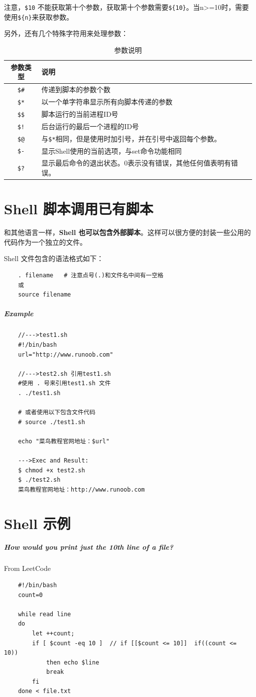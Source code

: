 \documentclass[UTF8,a4paper,12pt]{ctexbook}
\begin{document}
			注意，\verb|$10| 不能获取第十个参数，获取第十个参数需要\verb|${10}|。当n>=10时，需要使用\verb|${n}|来获取参数。 
			
			另外，还有几个特殊字符用来处理参数：
			\begin{table}[H]
				\centering
				\begin{tabular}{c|m{13cm}}
					\hline
				     参数类型   &  说明\\
					\hline 
					\verb|$#| & 传递到脚本的参数个数\\
					\verb|$*| & 以一个单字符串显示所有向脚本传递的参数\\
					\verb|$$| & 脚本运行的当前进程ID号\\
					\verb|$!| & 后台运行的最后一个进程的ID号\\
					\verb|$@| & 与\verb|$*|相同，但是使用时加引号，并在引号中返回每个参数。\\
					\verb|$-| & 显示Shell使用的当前选项，与set命令功能相同\\
					\verb|$?| & 显示最后命令的退出状态。0表示没有错误，其他任何值表明有错误。\\					
					\hline
				\end{tabular}
				\caption{参数说明}
			\end{table}
	 \section{Shell 脚本调用已有脚本}
		 和其他语言一样，\textbf{Shell 也可以包含外部脚本}。这样可以很方便的封装一些公用的代码作为一个独立的文件。
		 
		 Shell 文件包含的语法格式如下：
		 	\begin{lstlisting}
	. filename   # 注意点号(.)和文件名中间有一空格
	或	
	source filename
			\end{lstlisting}
			\subparagraph{Example}
			\begin{lstlisting}
	//--->test1.sh
	#!/bin/bash
	url="http://www.runoob.com"
	
	//--->test2.sh 引用test1.sh
	#使用 . 号来引用test1.sh 文件
	. ./test1.sh
	
	# 或者使用以下包含文件代码
	# source ./test1.sh
	
	echo "菜鸟教程官网地址：$url"
	
	--->Exec and Result:
	$ chmod +x test2.sh 
	$ ./test2.sh 
	菜鸟教程官网地址：http://www.runoob.com
		 	\end{lstlisting}	
	 \section{Shell 示例}
		 \subparagraph{How would you print just the 10th line of a file?}From LeetCode
			\begin{lstlisting}
	#!/bin/bash
	count=0
	
	while read line
	do
		let ++count;
		if [ $count -eq 10 ]  // if [[$count <= 10]]  if((count <= 10))
			then echo $line
			break
		fi
	done < file.txt
			\end{lstlisting}
\end{document}
